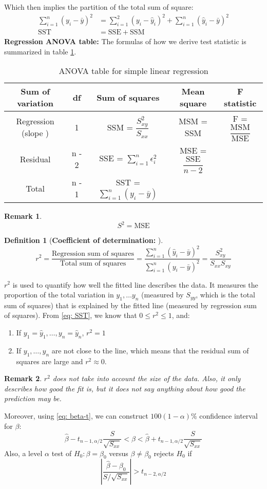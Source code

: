 \documentclass[11pt]{article}
\newtheorem{df}{Definition}[section]
\newtheorem{remark}{Remark}[subsection]
\begin{document}
Which then implies the partition of the total sum of square:
\begin{align}\label{eq: SST}
		\sum_{i = 1}^n(y_i - \bar{y})^2 & = \sum_{i = 1}^2 (y_i - \hat{y}_i)^2 + \sum_{i = 1}^n(\hat{y}_i - \bar{y})^2  \\
		\text{SST} & = \text{SSE} + \text{SSM}
\end{align}
\textbf{Regression ANOVA table: }The formulas of how we derive test statistic is summarized in table \ref{table: Reg-ANOVA}.
\begin{table}
	\centering
	\begin{tabular}{c c c c c } 
		\hline
		Sum of variation & df & Sum of squares & Mean square & F statistic \\
		\hline
		Regression (slope )& 1 & SSM = $\dfrac{S_{xy}^2}{S_{xx}}$ & MSM = SSM & F = $\dfrac{\text{MSM}}{\text{MSE}} $\\
		Residual & n - 2 & SSE = $\sum_{i = 1}^n \epsilon_i^2 $ & MSE = $\dfrac{\text{SSE}}{n - 2}$ & \\
		\hline
		Total & n - 1 & SST = $\sum_{i = 1}^n (y_i - \bar{y})$ & & \\
		\hline
	\end{tabular}
\caption{ANOVA table for simple linear regression }
\label{table: Reg-ANOVA}
\end{table}
\begin{remark}
	$$S^2 = \text{MSE} $$
\end{remark}
\begin{df}[\textbf{Coefficient of determination:  }] 
	\begin{equation}\label{eq: r2}
		r^2 = \dfrac{\text{Regression sum of squares}}{\text{Total sum of squares}} = \dfrac{\sum_{i = 1}^n (\hat{y}_i - \bar{y})^2}{\sum_{i = 1}^n (y_i - \bar{y})^2} = \dfrac{S_{xy}^2}{S_{xx} S_{xy}}
	\end{equation}
\end{df}
$r^2$ is used to quantify how well the fitted line describes the data. It measures the proportion of the total variation in $y_1, \dots y_n$ (measured by $S_{yy}$, which is the total sum of squares) that is explained by the fitted line (measured by regression sum of squares). From \ref{eq: SST}, we know that $ 0 \leq r^2 \leq 1$, and:
\begin{enumerate}
	\item  If $y_1 = \hat{y}_1, \dots, y_n = \hat{y}_n$, $r^2 = 1$
	\item If $y_1, \dots, y_n$ are not close to the line, which means that  the residual sum of squares are large and $r^2 \approx 0$. 
\end{enumerate}
\begin{remark}
	$r^2$ does not take into account the size of the data. Also, it only describes how good the fit is, but it does not say anything about how good the prediction may be.
\end{remark}
Moreover, using \ref{eq: beta-t}, we can construct $100(1 - \alpha)\%$ confidence interval for $\beta$:
$$\hat{\beta} - t_{n - 1, \alpha/2} \dfrac{S}{\sqrt{S_{xx}}} < \beta < \hat{\beta} + t_{n - 1, \alpha/2} \dfrac{S}{\sqrt{S_{xx}}}   $$
Also, a level $\alpha$ test of $H_0: \beta = \beta_0$ versus $\beta \neq \beta_0$ rejects $H_0$ if
$$\left|\dfrac{\hat{\beta } - \beta_0}{S / \sqrt{S_{xx}}} \right| > t_{n - 2, \alpha/2}$$
\end{document}
